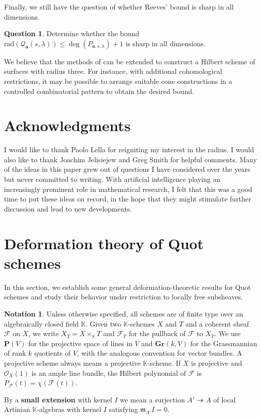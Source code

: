 \documentclass[leqno,11pt,a4paper]{amsart}
\theoremstyle{definition}
\newtheorem{notation}[notation]{Notation}
\newtheorem{question}[question]{Question}
\numberwithin{equation}{section}
\newcommand{\Gr}{\mathbf{Gr}}
\newcommand{\kk}{\mathbb{K}}
\newcommand{\bfa}{\mathbf{a}}
\newcommand{\rad}{\mathrm{rad}}
\newcommand{\PP}{\mathbf{P}}
\newcommand{\mfm}{\mathfrak{m}}
\newcommand{\FF}{\mathscr{F}}
\newcommand{\OO}{\mathscr{O}}
\newcommand{\QQ}{\mathcal{Q}}
\begin{document}
Finally, we still have the question of whether Reeves' bound is sharp in all dimensions.
 
\begin{question} Determine whether the bound $\rad(\QQ_{\bfa}(s,\lambda)) \leq \deg(P_{\bfa,s,\lambda})+1$ is sharp in all dimensions.
\end{question}
We believe that the methods of  can be extended to construct a Hilbert scheme of surfaces with radius three. 
For instance, with additional cohomological restrictions, it may be possible to arrange suitable cone constructions in a controlled combinatorial pattern to obtain the desired bound.


\section*{Acknowledgments}
I would like to thank Paolo Lella for reigniting my interest in the radius. 
I would also like to thank Joachim Jelisiejew and Greg Smith  for helpful comments.
Many of the ideas in this paper grew out of questions I have considered over the years but never committed to writing. With artificial intelligence playing an increasingly prominent role in mathematical research, I felt that this was a good time to put these ideas on record, in the hope that they might stimulate further discussion and lead to new developments.


\section{Deformation theory of Quot schemes}
In this section, we establish some general deformation-theoretic results for Quot schemes and study their behavior under restriction to locally free subsheaves. 

\begin{notation} Unless otherwise specified, all schemes are of finite type over an algebraically closed field $\kk$. Given two $\kk$-schemes $X$ and $T$ and a coherent sheaf $\FF$ on $X$, we write $X_T = X \times _\kk T$ and $\FF_T$ for the pullback of $\FF$ to $X_T$. 
We use $\PP(V)$ for the projective space of lines in $V$ and $\Gr(k,V)$ for the Grassmannian of rank $k$ quotients of $V$, with the analogous convention for vector bundles.
A projective scheme always means a projective $\kk$-scheme. 
If $X$ is projective and $\OO_X(1)$ is an ample line bundle, the Hilbert polynomial of $\FF$ is $P_{\FF}(t) = \chi(\FF(t))$.

By a \textbf{small extension} with kernel $I$ we mean a surjection $A' \twoheadrightarrow A$ of local Artinian $\kk$-algebras with kernel $I$ satisfying $\mfm_{A'}I=0$.
\end{notation}
\end{document}
